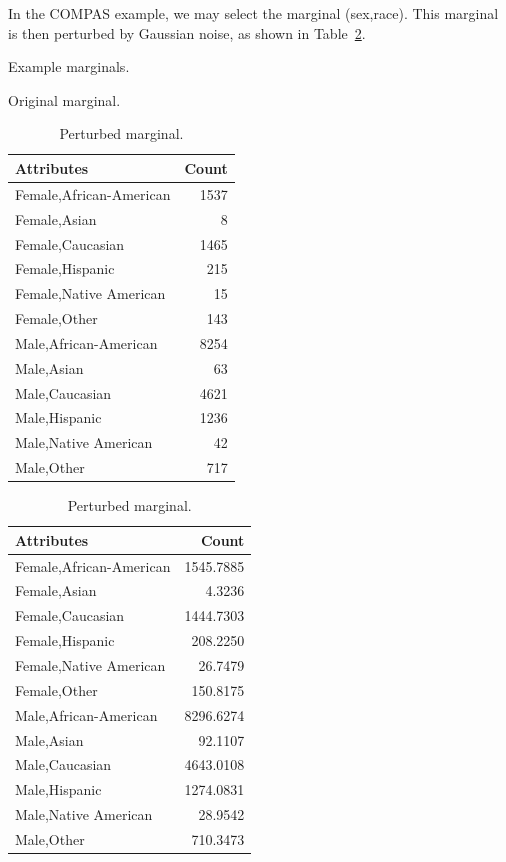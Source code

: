 \documentclass[manuscript,screen,review,anonymous]{acmart}
\begin{document}
In the COMPAS example, we may select the marginal (sex,race). This marginal is then perturbed by Gaussian noise, as shown in Table~\ref{tab:marginal-perturbed}.

\begin{table}[h]
\caption{Example marginals.}
\label{tab:marginal-perturbed}
\centering
\begin{subtable}[t]{0.45\linewidth}
\centering
\caption{Original marginal.}
\begin{tabular}{lr}
\toprule
Attributes & Count \\
\midrule
Female,African-American & 1537 \\
Female,Asian & 8 \\
Female,Caucasian & 1465 \\
Female,Hispanic & 215 \\
Female,Native American & 15 \\
Female,Other & 143 \\
Male,African-American & 8254 \\
Male,Asian & 63 \\
Male,Caucasian & 4621 \\
Male,Hispanic & 1236 \\
Male,Native American & 42 \\
Male,Other & 717 \\
\bottomrule
\end{tabular}
\end{subtable}
\begin{subtable}[t]{0.45\linewidth}
\centering
\caption{Perturbed marginal.}
\begin{tabular}{lr}
\toprule
Attributes & Count \\
\midrule
Female,African-American & 1545.7885 \\
Female,Asian & 4.3236 \\
Female,Caucasian & 1444.7303 \\
Female,Hispanic & 208.2250 \\
Female,Native American & 26.7479 \\
Female,Other & 150.8175 \\
Male,African-American & 8296.6274 \\
Male,Asian & 92.1107 \\
Male,Caucasian & 4643.0108 \\
Male,Hispanic & 1274.0831 \\
Male,Native American & 28.9542 \\
Male,Other & 710.3473 \\
\bottomrule
\end{tabular}
\end{subtable}
\end{table}
\end{document}
